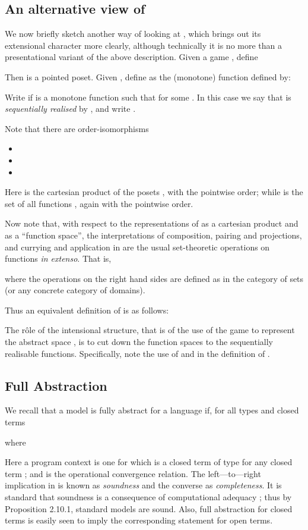 \documentclass[11pt]{article}
\begin{document}
\subsection{An alternative view of }
We now briefly sketch another way of looking
at , which brings out its extensional character more clearly,
although technically it is no more than a presentational variant of the
above description.
Given a game , define

Then  is a pointed poset. Given , define
 as the (monotone) function defined by:

Write  if  is a monotone
function such that  for some . In this
case we say that  is {\em sequentially realised} by , and write
.

Note that there are order-isomorphisms

\begin{itemize}
\item 
\item 
\item 
\end{itemize}

Here  is the cartesian product of the posets ,
with the pointwise order; while  is the set of
all functions , again with the pointwise order.

Now note that, with respect to the representations of  as a
cartesian product and  as a ``function space'', the
interpretations of composition, pairing and projections, and currying and
application in  are the usual set-theoretic operations on functions
{\em in extenso}. That is,

\noindent where the operations on the right hand sides are defined as
in the category
of sets (or any concrete category of domains).

Thus an equivalent definition of  is as follows:


The r\^ole of the intensional structure, that is of the use of the game 
to represent the abstract space , is to cut down the function spaces
to the sequentially realisable functions. Specifically, note the use of 
and  in the definition of .

\subsection{Full Abstraction}

We recall that a model  is fully abstract for a language  if,
for all types  and closed terms 

where

Here a program context  is one for which  is a closed term of type
  for any closed term ; and  is the operational
convergence relation. The left---to---right implication in  is known as
{\em soundness} and the converse as {\em completeness}.
It is standard that soundness is a consequence of computational
adequacy \cite{CurienPL:catcsa};
thus by Proposition 2.10.1, standard models are sound. Also,
full abstraction for closed terms is easily seen to imply the corresponding
statement  for open terms.
\end{document}

